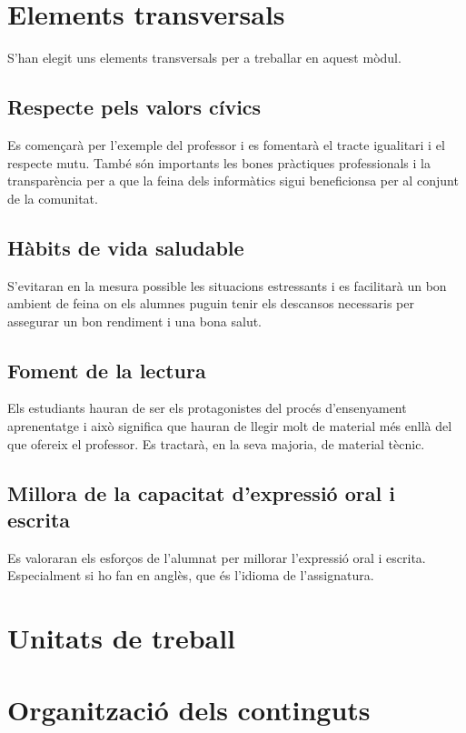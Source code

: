 \documentclass[catalan, a4paper, 12pt, titlepage]{article}
\begin{document}
\section{Elements transversals}

S'han elegit uns elements transversals per a treballar en aquest mòdul.

\subsection{Respecte pels valors cívics}

Es començarà per l'exemple del professor i es fomentarà el tracte igualitari i el respecte mutu. També són importants les bones pràctiques professionals i la transparència per a que la feina dels informàtics sigui beneficionsa per al conjunt de la comunitat.

\subsection{Hàbits de vida saludable}

S'evitaran en la mesura possible les situacions estressants i es facilitarà un bon ambient de feina on els alumnes puguin tenir els descansos necessaris per assegurar un bon rendiment i una bona salut.

\subsection{Foment de la lectura}

Els estudiants hauran de ser els protagonistes del procés d'ensenyament aprenentatge i això significa que hauran de llegir molt de material més enllà del que ofereix el professor. Es tractarà, en la seva majoria, de material tècnic.

\subsection{Millora de la capacitat d'expressió oral i escrita}

Es valoraran els esforços de l'alumnat per millorar l'expressió oral i escrita. Especialment si ho fan en anglès, que és l'idioma de l'assignatura.

\section{Unitats de treball}

\section{Organització dels continguts}
\end{document}
